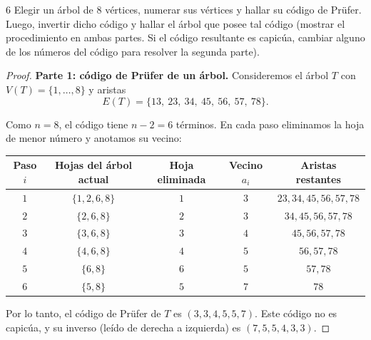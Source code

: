 \begin{ejercicioEntregar}{6}
    Elegir un árbol de \( 8 \) vértices, numerar sus vértices y hallar su código de Prüfer. Luego, invertir dicho código y hallar el árbol que posee tal código (mostrar el procedimiento en ambas partes. Si el código resultante es capicúa, cambiar alguno de los números del código para resolver la segunda parte).
\end{ejercicioEntregar}
\begin{proof}
    \textbf{Parte 1: código de Prüfer de un árbol.} Consideremos el árbol \( T \) con \( V(T) = \{1, \ldots, 8\} \) y aristas
    \[
        E(T) = \{13,\ 23,\ 34,\ 45,\ 56,\ 57,\ 78\}.
    \]
    \begin{center}
    \end{center}
    Como \( n = 8 \), el código tiene \( n-2 = 6 \) términos. En cada paso eliminamos la hoja de menor número y anotamos su vecino:
    \begin{center}
        \begin{tabular}{ccccc}
            \toprule
            Paso \( i \) & Hojas del árbol actual & Hoja eliminada & Vecino \( a_i \) & Aristas restantes            \\
            \midrule
            \( 1 \)      & \( \{1,2,6,8\} \)      & \( 1 \)        & \( 3 \)          & \( 23, 34, 45, 56, 57, 78 \) \\
            \( 2 \)      & \( \{2,6,8\} \)        & \( 2 \)        & \( 3 \)          & \( 34, 45, 56, 57, 78 \)     \\
            \( 3 \)      & \( \{3,6,8\} \)        & \( 3 \)        & \( 4 \)          & \( 45, 56, 57, 78 \)         \\
            \( 4 \)      & \( \{4,6,8\} \)        & \( 4 \)        & \( 5 \)          & \( 56, 57, 78 \)             \\
            \( 5 \)      & \( \{6,8\} \)          & \( 6 \)        & \( 5 \)          & \( 57, 78 \)                 \\
            \( 6 \)      & \( \{5,8\} \)          & \( 5 \)        & \( 7 \)          & \( 78 \)                     \\
            \bottomrule
        \end{tabular}
    \end{center}
    Por lo tanto, el código de Prüfer de \( T \) es \( (3,3,4,5,5,7) \). Este código no es capicúa, y su inverso (leído de derecha a izquierda) es \( (7,5,5,4,3,3) \).


\end{proof}
